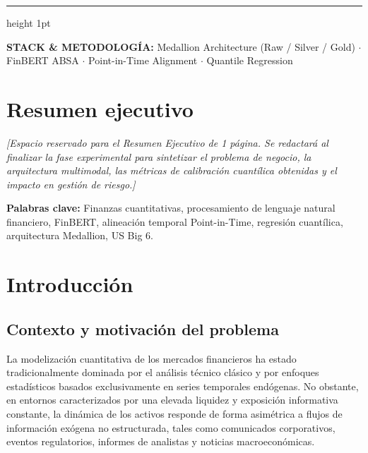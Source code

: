 \documentclass[11pt, a4paper]{report}
\begin{document}
\begin{titlepage}
    \vfill

    {\color{LightTint}\hrule height 1pt}
    \vspace{0.4cm}
    {\footnotesize\color{MutedGray}
    \textbf{STACK \& METODOLOGÍA:} Medallion Architecture (Raw / Silver / Gold) $\cdot$ FinBERT ABSA $\cdot$ Point-in-Time Alignment $\cdot$ Quantile Regression}
\end{titlepage}

\chapter*{Resumen ejecutivo}

\textit{[Espacio reservado para el Resumen Ejecutivo de 1 página. Se redactará al finalizar la fase experimental para sintetizar el problema de negocio, la arquitectura multimodal, las métricas de calibración cuantílica obtenidas y el impacto en gestión de riesgo.]}

\vspace{1em}
\noindent\textbf{\color{NavyPrimary}Palabras clave:} Finanzas cuantitativas, procesamiento de lenguaje natural financiero, FinBERT, alineación temporal Point-in-Time, regresión cuantílica, arquitectura Medallion, US Big 6.

\clearpage

\tableofcontents
\clearpage

\chapter{Introducción}

\section{Contexto y motivación del problema}
La modelización cuantitativa de los mercados financieros ha estado tradicionalmente dominada por el análisis técnico clásico y por enfoques estadísticos basados exclusivamente en series temporales endógenas. No obstante, en entornos caracterizados por una elevada liquidez y exposición informativa constante, la dinámica de los activos responde de forma asimétrica a flujos de información exógena no estructurada, tales como comunicados corporativos, eventos regulatorios, informes de analistas y noticias macroeconómicas.
\end{document}
